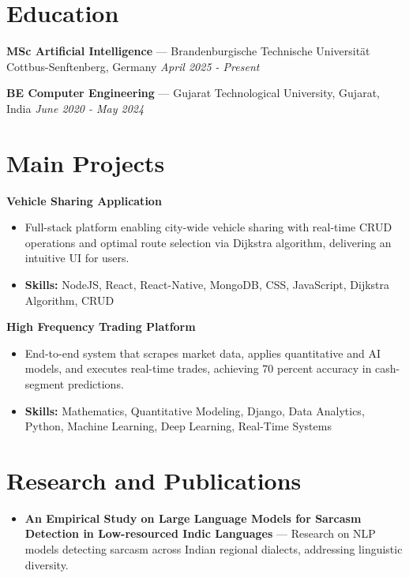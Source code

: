 \documentclass[a4paper,10pt]{article}
\begin{document}
\section*{Education}
\textbf{MSc Artificial Intelligence} — Brandenburgische Technische Universität Cottbus-Senftenberg, Germany \hfill \textit{April 2025 - Present}\par
\vspace{1.5pt}
\textbf{BE Computer Engineering} — Gujarat Technological University, Gujarat, India \hfill \textit{June 2020 - May 2024}\par

\section*{Main Projects}
\textbf{Vehicle Sharing Application}\par
\vspace{1pt}
\begin{itemize}
  \item Full-stack platform enabling city-wide vehicle sharing with real-time CRUD operations and optimal route selection via Dijkstra algorithm, delivering an intuitive UI for users.
  \item \textbf{Skills:} NodeJS, React, React-Native, MongoDB, CSS, JavaScript, Dijkstra Algorithm, CRUD
\end{itemize}
\vspace{3pt}
\textbf{High Frequency Trading Platform}\par
\vspace{1pt}
\begin{itemize}
  \item End-to-end system that scrapes market data, applies quantitative and AI models, and executes real-time trades, achieving 70 percent accuracy in cash-segment predictions.
  \item \textbf{Skills:} Mathematics, Quantitative Modeling, Django, Data Analytics, Python, Machine Learning, Deep Learning, Real-Time Systems
\end{itemize}

\section*{Research and Publications}
\begin{itemize}
\item \textbf{An Empirical Study on Large Language Models for Sarcasm Detection in Low-resourced Indic Languages} — Research on NLP models detecting sarcasm across Indian regional dialects, addressing linguistic diversity.
\end{itemize}
\end{document}
